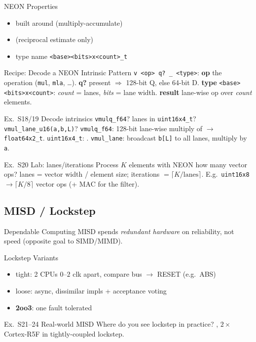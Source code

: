 \begin{concept}{NEON Properties}
    \begin{itemize}
        \item built around  (multiply-accumulate)
        \item {} (reciprocal estimate only)
        \item type name \texttt{<base><bits>x<count>\_t}
    \end{itemize}
\end{concept}

\begin{KR}{Recipe: Decode a NEON Intrinsic}
    Pattern \texttt{v <op> q? \_ <type>}:
    \textbf{op} the operation (\texttt{mul}, \texttt{mla}, \ldots).
    \textbf{q?} present $\Rightarrow$ 128-bit Q, else 64-bit D.
    \textbf{type} \texttt{<base><bits>x<count>}: \emph{count} = lanes, \emph{bits} = lane width.
    \textbf{result} lane-wise op over \emph{count} elements.
\end{KR}

\begin{example2}{Ex.\ S18/19 Decode intrinsics}
    \texttt{vmulq\_f64}? lanes in \texttt{uint16x4\_t}? \texttt{vmul\_lane\_u16(a,b,L)}?
    \tcblower
    \texttt{vmulq\_f64}: 128-bit lane-wise multiply of  $\to$ \texttt{float64x2\_t}. \texttt{uint16x4\_t}: . \texttt{vmul\_lane}: broadcast \texttt{b[L]} to all lanes, multiply by \texttt{a}.
\end{example2}

\begin{example2}{Ex.\ S20 Lab: lanes/iterations}
    Process $K$ elements with NEON how many vector ops?
    \tcblower
    lanes = vector width / element size; iterations $=\lceil K/\text{lanes}\rceil$. E.g.\ \texttt{uint16x8} $\to \lceil K/8\rceil$ vector ops (+ MAC for the filter).
\end{example2}

\subsection{MISD / Lockstep}

\begin{concept}{Dependable Computing}
    MISD spends \emph{redundant hardware} on reliability, not speed (opposite goal to SIMD/MIMD).
\end{concept}

\begin{definition}{Lockstep Variants}
    \begin{itemize}
        \item tight: 2 CPUs $0$--$2$ clk apart, compare bus $\to$ RESET (e.g.\ ABS)
        \item loose: async, dissimilar impls + acceptance voting
        \item \textbf{2oo3}: one fault tolerated
    \end{itemize}
\end{definition}

\begin{example2}{Ex.\ S21--24 Real-world MISD}
    Where do you see lockstep in practice?
    \tcblower
    , $2{\times}$Cortex-R5F in tightly-coupled lockstep.
\end{example2}
